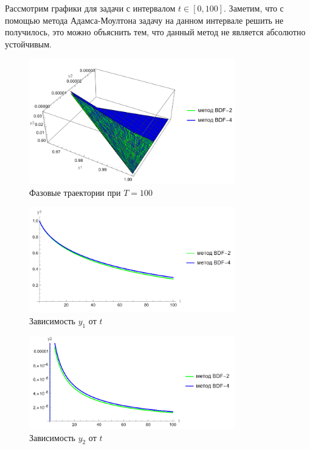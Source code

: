 \documentclass[12pt, a4paper]{article}
\begin{document}
\newpage
Рассмотрим графики для задачи с интервалом $t \in [0, 100]$. Заметим, что с помощью метода Адамса-Моултона задачу на данном интервале решить не получилось, это можно объяснить тем, что данный метод не является абсолютно устойчивым.

\begin{figure}[!htbp]
	\centering
	\includegraphics[width=0.8\textwidth]{T100-0}%
	\caption{Фазовые траектории при $T = 100$}
	\vspace*{-2mm}
	\label{T100-0}
\end{figure}
\begin{figure}[!htbp]
	\centering
	\includegraphics[width=0.8\textwidth]{T100-1}%
	\caption{Зависимость $y_1$ от $t$}
	\vspace*{-2mm}
	\label{T100-1}
\end{figure}
\begin{figure}[!htbp]
	\centering
	\includegraphics[width=0.8\textwidth]{T100-2}%
	\caption{Зависимость $y_2$ от $t$}
	\vspace*{-2mm}
	\label{T100-2}
\end{figure}
\end{document}

